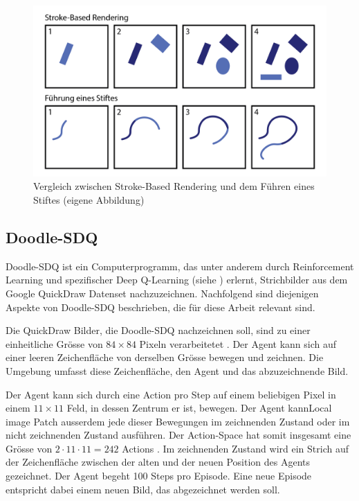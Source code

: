 \begin{figure}[!ht]
   \centering
   \includegraphics[width=\textwidth]{images/theorie/stroke-v-stift.png}
   \caption{Vergleich zwischen Stroke-Based Rendering und dem Führen eines Stiftes (eigene Abbildung)}\label{fig:stroke-v-stift}
\end{figure}
 
\subsection{Doodle-SDQ}\label{sub:t_ver_dood} Doodle-SDQ ist ein
Computerprogramm, das unter anderem durch Reinforcement Learning und
spezifischer Deep Q-Learning (siehe ) erlernt,
Strichbilder aus dem Google QuickDraw Datenset \cite{noauthor_quick_2022}
nachzuzeichnen. Nachfolgend sind diejenigen Aspekte von Doodle-SDQ beschrieben,
die für diese Arbeit relevant sind.
 
Die QuickDraw Bilder, die Doodle-SDQ nachzeichnen soll, sind zu einer
einheitliche Grösse von $84\times84$ Pixeln verarbeitetet \cite[S.
7]{zhou_learning_2018}. Der Agent kann sich auf einer leeren Zeichenfläche von
derselben Grösse bewegen und zeichnen. Die Umgebung umfasst diese
Zeichenfläche, den Agent und das abzuzeichnende Bild.
 
Der Agent kann sich durch eine Action pro Step auf einem beliebigen Pixel in
einem $11\times11$ Feld, in dessen Zentrum er ist, bewegen. Der Agent kannLocal image Patch
ausserdem jede dieser Bewegungen im zeichnenden Zustand oder im nicht
zeichnenden Zustand ausführen. Der Action-Space hat somit insgesamt eine Grösse
von $2\cdot11\cdot11 = 242$ Actions \cite[S. 5]{zhou_learning_2018}. Im
zeichnenden Zustand wird ein Strich auf der Zeichenfläche zwischen der alten und
der neuen Position des Agents gezeichnet. Der Agent begeht 100 Steps pro
Episode. Eine neue Episode entspricht dabei einem neuen Bild, das abgezeichnet
werden soll.
 

